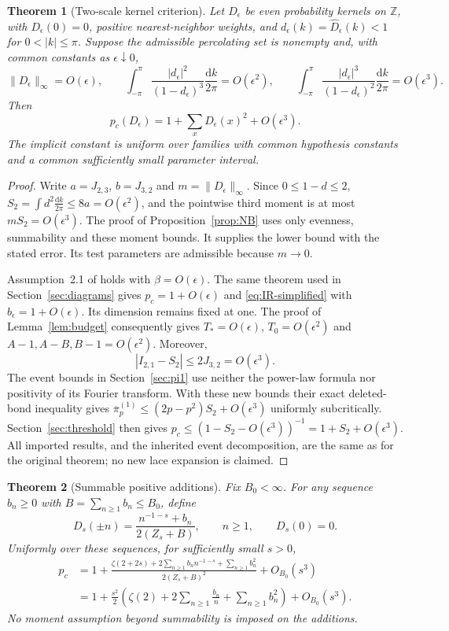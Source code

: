 \documentclass[11pt]{article}
\newtheorem{theorem}{Theorem}[section]
\theoremstyle{definition}
\newcommand{\Z}{\mathbb Z}
\newcommand{\intk}{\int_{-\pi}^{\pi}}
\newcommand{\dm}{\frac{\mathrm dk}{2\pi}}
\begin{document}
\begin{theorem}[Two-scale kernel criterion]\label{thm:criterion}
Let $D_\epsilon$ be even probability kernels on $\Z$, with $D_\epsilon(0)=0$,
positive nearest-neighbor weights, and $d_\epsilon(k)=\widehat D_\epsilon(k)<1$
for $0<|k|\le\pi$. Suppose the admissible percolating set is nonempty and,
with common constants as $\epsilon\downarrow0$,
\[
 \|D_\epsilon\|_\infty=O(\epsilon),\qquad
 \intk\frac{|d_\epsilon|^2}{(1-d_\epsilon)^3}\dm=O(\epsilon^2),
 \qquad
 \intk\frac{|d_\epsilon|^3}{(1-d_\epsilon)^2}\dm=O(\epsilon^3).
\]
Then
\[
 p_c(D_\epsilon)=1+\sum_xD_\epsilon(x)^2+O(\epsilon^3).
\]
The implicit constant is uniform over families with common hypothesis constants
and a common sufficiently small parameter interval.
\end{theorem}

\begin{proof}
Write $a=J_{2,3}$, $b=J_{3,2}$ and $m=\|D_\epsilon\|_\infty$.
Since $0\le1-d\le2$, $S_2=\int d^2\dm\le8a=O(\epsilon^2)$,
and the pointwise third moment is at most $mS_2=O(\epsilon^3)$.
The proof of Proposition~\ref{prop:NB} uses only evenness, summability
and these moment bounds. It supplies the lower bound with the stated error.
Its test parameters are admissible because $m\to0$.

Assumption~2.1 of \cite{HHS2008} holds with $\beta=O(\epsilon)$.
The same theorem used in Section~\ref{sec:diagrams} gives
$p_c=1+O(\epsilon)$ and \eqref{eq:IR-simplified} with
$b_\epsilon=1+O(\epsilon)$. Its dimension remains fixed at one.
The proof of Lemma~\ref{lem:budget} consequently gives
$T_*=O(\epsilon)$, $T_0=O(\epsilon^2)$ and
$A-1,A-B,B-1=O(\epsilon^2)$. Moreover,
\[
 |I_{2,1}-S_2|\le2J_{3,2}=O(\epsilon^3).
\]
The event bounds in Section~\ref{sec:pi1} use neither the power-law formula
nor positivity of its Fourier transform. With these new bounds their exact
deleted-bond inequality gives
$\overline\pi_p^{(1)}\le(2p-p^2)S_2+O(\epsilon^3)$ uniformly
subcritically. Section~\ref{sec:threshold} then gives
$p_c\le(1-S_2-O(\epsilon^3))^{-1}=1+S_2+O(\epsilon^3)$.
All imported results, and the inherited event decomposition, are the same as
for the original theorem; no new lace expansion is claimed.
\end{proof}

\begin{theorem}[Summable positive additions]\label{thm:additions}
Fix $B_0<\infty$. For any sequence $b_n\ge0$ with
$B=\sum_{n\ge1}b_n\le B_0$, define
\[
 D_s(\pm n)=\frac{n^{-1-s}+b_n}{2(Z_s+B)},\qquad n\ge1,\qquad D_s(0)=0.
\]
Uniformly over these sequences, for sufficiently small $s>0$,
\begin{align*}
 p_c&=1+\frac{\zeta(2+2s)+2\sum_{n\ge1}b_nn^{-1-s}
                    +\sum_{n\ge1}b_n^2}{2(Z_s+B)^2}+O_{B_0}(s^3)\\
 &=1+\frac{s^2}{2}\left(\zeta(2)+2\sum_{n\ge1}\frac{b_n}{n}
                                      +\sum_{n\ge1}b_n^2\right)
                                      +O_{B_0}(s^3).
\end{align*}
No moment assumption beyond summability is imposed on the additions.
\end{theorem}
\end{document}
